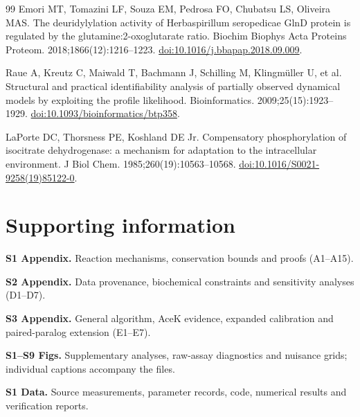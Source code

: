 \documentclass[10pt,letterpaper]{article}
\begin{document}
\begin{thebibliography}{99}
Emori MT, Tomazini LF, Souza EM, Pedrosa FO, Chubatsu LS, Oliveira MAS. The deuridylylation activity of Herbaspirillum seropedicae GlnD protein is regulated by the glutamine:2-oxoglutarate ratio. Biochim Biophys Acta Proteins Proteom. 2018;1866(12):1216--1223. \href{https://doi.org/10.1016/j.bbapap.2018.09.009}{doi:10.1016/j.bbapap.2018.09.009}.

Raue A, Kreutz C, Maiwald T, Bachmann J, Schilling M, Klingm{\"u}ller U, et al. Structural and practical identifiability analysis of partially observed dynamical models by exploiting the profile likelihood. Bioinformatics. 2009;25(15):1923--1929. \href{https://doi.org/10.1093/bioinformatics/btp358}{doi:10.1093/bioinformatics/btp358}.

LaPorte DC, Thorsness PE, Koshland DE Jr. Compensatory phosphorylation of isocitrate dehydrogenase: a mechanism for adaptation to the intracellular environment. J Biol Chem. 1985;260(19):10563--10568. \href{https://doi.org/10.1016/S0021-9258(19)85122-0}{doi:10.1016/S0021-9258(19)85122-0}.
\end{thebibliography}


\section*{Supporting information}

\noindent\textbf{S1 Appendix.} Reaction mechanisms, conservation bounds and proofs (A1--A15).

\noindent\textbf{S2 Appendix.} Data provenance, biochemical constraints and sensitivity analyses (D1--D7).

\noindent\textbf{S3 Appendix.} General algorithm, AceK evidence, expanded calibration and paired-paralog extension (E1--E7).

\noindent\textbf{S1--S9 Figs.} Supplementary analyses, raw-assay diagnostics and nuisance grids; individual captions accompany the files.

\noindent\textbf{S1 Data.} Source measurements, parameter records, code, numerical results and verification reports.
\end{document}
